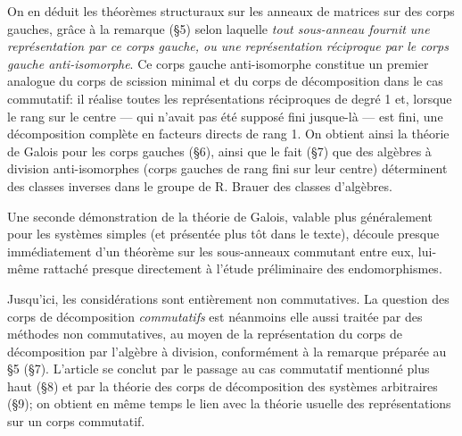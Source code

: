 On en déduit les théorèmes structuraux sur les anneaux de matrices sur des corps gauches, grâce à la remarque (\S 5) selon laquelle \emph{tout sous-anneau fournit une représentation par ce corps gauche, ou une représentation réciproque par le corps gauche anti-isomorphe}. Ce corps gauche anti-isomorphe constitue un premier analogue du corps de scission minimal et du corps de décomposition dans le cas commutatif: il réalise toutes les représentations réciproques de degré 1 et, lorsque le rang sur le centre --- qui n'avait pas été supposé fini jusque-là --- est fini, une décomposition complète en facteurs directs de rang 1. On obtient ainsi la théorie de Galois pour les corps gauches (\S 6), ainsi que le fait (\S 7) que des algèbres à division anti-isomorphes (corps gauches de rang fini sur leur centre) déterminent des classes inverses dans le groupe de R. Brauer des classes d'algèbres.

Une seconde démonstration de la théorie de Galois, valable plus généralement pour les systèmes simples (et présentée plus tôt dans le texte), découle presque immédiatement d'un théorème sur les sous-anneaux commutant entre eux, lui-même rattaché presque directement à l'étude préliminaire des endomorphismes.

Jusqu'ici, les considérations sont entièrement non commutatives. La question des corps de décomposition \emph{commutatifs} est néanmoins elle aussi traitée par des méthodes non commutatives, au moyen de la représentation du corps de décomposition par l'algèbre à division, conformément à la remarque préparée au \S 5 (\S 7). L'article se conclut par le passage au cas commutatif mentionné plus haut (\S 8) et par la théorie des corps de décomposition des systèmes arbitraires (\S 9); on obtient en même temps le lien avec la théorie usuelle des représentations sur un corps commutatif.

